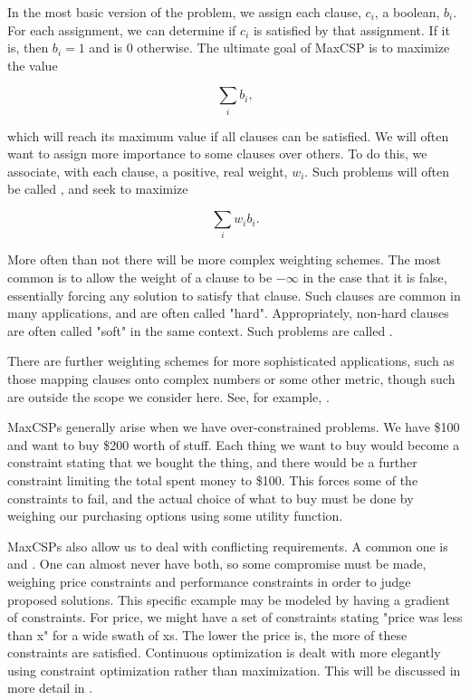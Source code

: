 In the most basic version of the problem, we assign each clause, $c_i$, a boolean, $b_i$. For each assignment, we can determine if $c_i$ is satisfied by that assignment. If it is, then $b_i = 1$ and is $0$ otherwise. The ultimate goal of MaxCSP is to maximize the value

\begin{equation}
    \sum_i b_i,
\end{equation}

which will reach its maximum value if all clauses can be satisfied. We will often want to assign more importance to some clauses over others. To do this, we associate, with each clause, a positive, real weight, $w_i$. Such problems will often be called , and seek to maximize

\begin{equation}
    \sum_i w_i b_i.
\end{equation}

More often than not there will be more complex weighting schemes. The most common is to allow the weight of a clause to be $-\infty$ in the case that it is false, essentially forcing any solution to satisfy that clause. Such  clauses are common in many applications, and are often called "hard". Appropriately, non-hard clauses are often called "soft" in the same context. Such problems are called .

\begin{remark}
There are further weighting schemes for more sophisticated applications, such as those mapping clauses onto complex numbers or some other metric, though such are outside the scope we consider here. See, for example, \citep{cai2017complexity}.
\end{remark}

MaxCSPs generally arise when we have over-constrained problems. We have \$100 and want to buy \$200 worth of stuff. Each thing we want to buy would become a constraint stating that we bought the thing, and there would be a further  constraint limiting the total spent money to \$100. This forces some of the  constraints to fail, and the actual choice of what to buy must be done by weighing our purchasing options using some utility function. 

MaxCSPs also allow us to deal with conflicting requirements. A common one is
 and . One can almost never have both, so
some compromise must be made, weighing price constraints and performance
constraints in order to judge proposed solutions. This specific example may be
modeled by having a gradient of constraints. For price, we might have a set of
constraints stating "price was less than x" for a wide swath of xs. The lower
the price is, the more of these constraints are satisfied. Continuous
optimization is dealt with more elegantly using constraint optimization rather
than maximization. This will be discussed in more detail in
.

